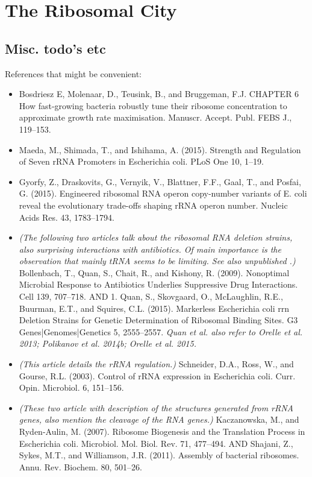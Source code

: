 



\chapter{The Ribosomal City}
\label{chapter:ribosomes}

{\color{red}
\section{Misc. todo's etc}

References that might be convenient:
\begin{itemize}
    \item Bosdriesz E, Molenaar, D., Teusink, B., and Bruggeman, F.J. CHAPTER 6 How fast-growing bacteria robustly tune their ribosome concentration to approximate growth rate maximisation. Manuscr. Accept. Publ. FEBS J., 119–153.
    \cite{BosdrieszE}
    \item Maeda, M., Shimada, T., and Ishihama, A. (2015). Strength and Regulation of Seven rRNA Promoters in Escherichia coli. PLoS One 10, 1–19. \cite{Maeda2015}
    \item Gyorfy, Z., Draskovits, G., Vernyik, V., Blattner, F.F., Gaal, T., and Posfai, G. (2015). Engineered ribosomal RNA operon copy-number variants of E. coli reveal the evolutionary trade-offs shaping rRNA operon number. Nucleic Acids Res. 43, 1783–1794. \cite{Gyorfy2015}
    \item \textit{(The following two articles talk about the ribosomal RNA deletion strains, also surprising interactions with antibiotics. Of main importance is the observation that mainly tRNA seems to be limiting. See also unpublished \cite{Quan2013}.)} Bollenbach, T., Quan, S., Chait, R., and Kishony, R. (2009). Nonoptimal Microbial Response to Antibiotics Underlies Suppressive Drug Interactions. Cell 139, 707–718. \cite{Bollenbach2009} AND 1. Quan, S., Skovgaard, O., McLaughlin, R.E., Buurman, E.T., and Squires, C.L. (2015). Markerless Escherichia coli rrn Deletion Strains for Genetic Determination of Ribosomal Binding Sites. G3 Genes|Genomes|Genetics 5, 2555–2557. \cite{Quan2015} \textit{Quan et al. also refer to Orelle et al. 2013; Polikanov et al. 2014b; Orelle et al. 2015.}
    \item \textit{(This article details the rRNA regulation.)} Schneider, D.A., Ross, W., and Gourse, R.L. (2003). Control of rRNA expression in Escherichia coli. Curr. Opin. Microbiol. 6, 151–156. \cite{Schneider2003} 
    \item \textit{(These two article with description of the structures generated from rRNA genes, also mention the cleavage of the RNA genes.)}  Kaczanowska, M., and Ryden-Aulin, M. (2007). Ribosome Biogenesis and the Translation Process in Escherichia coli. Microbiol. Mol. Biol. Rev. 71, 477–494. \cite{Kaczanowska2007} AND Shajani, Z., Sykes, M.T., and Williamson, J.R. (2011). Assembly of bacterial ribosomes. Annu. Rev. Biochem. 80, 501–26. \cite{Shajani2011}

\end{itemize}}
